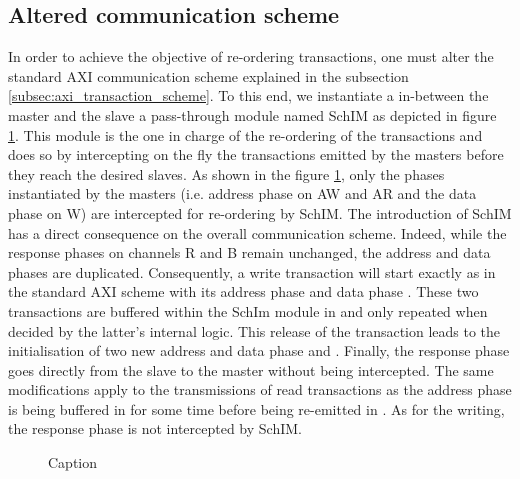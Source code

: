 \subsection{Altered communication scheme}
\label{subsec:communication-scheme}

In order to achieve the objective of re-ordering transactions, one
must alter the standard AXI communication scheme explained in the
subsection \ref{subsec:axi_transaction_scheme}.  To this end, we
instantiate a in-between the master and the slave a pass-through
module named SchIM as depicted in figure
\ref{fig:SchIM_transaction_scheme_figure}.  This module is the one in
charge of the re-ordering of the transactions and does so by
intercepting on the fly the transactions emitted by the masters before
they reach the desired slaves.  As shown in the figure
\ref{fig:SchIM_transaction_scheme_figure}, only the phases
instantiated by the masters (i.e. address phase on AW and AR and the
data phase on W) are intercepted for re-ordering by SchIM.  The
introduction of SchIM has a direct consequence on the overall
communication scheme. Indeed, while the response phases on channels R
and B remain unchanged, the address and data phases are duplicated.
Consequently, a write transaction will start exactly as in the
standard AXI scheme with its address phase  and data phase
.  These two transactions are buffered within the SchIm
module in  and only repeated when decided by the latter's
internal logic.  This release of the transaction leads to the
initialisation of two new address and data phase  and
.  Finally, the response phase  goes directly
from the slave to the master without being intercepted.  The same
modifications apply to the transmissions of read transactions as the
address phase  is being buffered in  for some
time before being re-emitted in .  As for the writing, the
response phase  is not intercepted by SchIM.

\begin{figure}
  \centering
  
  \caption{Caption}
  \label{fig:SchIM_transaction_scheme_figure}
\end{figure}

